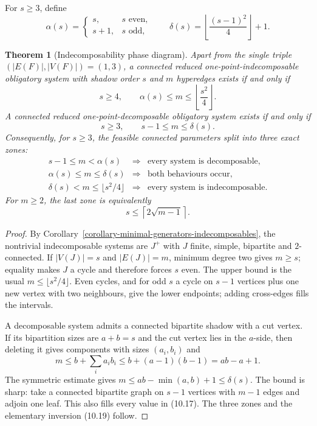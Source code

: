 \documentclass[a4paper,11pt,reqno]{amsart}
\theoremstyle{plain}
\newtheorem{theorem}{Theorem}[section]
\theoremstyle{definition}
\theoremstyle{remark}
\begin{document}
For $s\ge3$, define
\[
\alpha(s)=
\begin{cases}
s,&s\text{ even},\\
s+1,&s\text{ odd},
\end{cases}
\qquad
\delta(s)=\left\lfloor\frac{(s-1)^2}{4}\right\rfloor+1.
\]

\begin{theorem}[Indecomposability phase diagram]
\label{theorem-indecomposability-phase-diagram}
Apart from the single triple $(|E(F)|,|V(F)|)=(1,3)$, a connected reduced
one-point-indecomposable obligatory system with shadow order $s$ and $m$
hyperedges exists if and only if
\[
s\ge4,
\qquad
\alpha(s)\le m\le\left\lfloor\frac{s^2}{4}\right\rfloor.
\tag{10.16}
\]
A connected reduced one-point-decomposable obligatory system exists if and
only if
\[
s\ge3,
\qquad
s-1\le m\le\delta(s).
\tag{10.17}
\]
Consequently, for $s\ge3$, the feasible connected parameters split into three exact zones:
\[
\begin{array}{rcl}
s-1\le m<\alpha(s)
 &\Longrightarrow& \text{every system is decomposable},\\
\alpha(s)\le m\le\delta(s)
 &\Longrightarrow& \text{both behaviours occur},\\
\delta(s)<m\le\lfloor s^2/4\rfloor
 &\Longrightarrow& \text{every system is indecomposable}.
\end{array}
\tag{10.18}
\]
For $m\ge2$, the last zone is equivalently
\[
s\le\left\lceil2\sqrt{m-1}\right\rceil.
\tag{10.19}
\]
\end{theorem}
\begin{proof}
By Corollary~\ref{corollary-minimal-generators-indecomposables}, the nontrivial
indecomposable systems are $J^+$ with $J$ finite, simple, bipartite and
$2$-connected.  If $|V(J)|=s$ and $|E(J)|=m$, minimum degree two gives
$m\ge s$; equality makes $J$ a cycle and therefore forces $s$ even.  The
upper bound is the usual $m\le\lfloor s^2/4\rfloor$.  Even cycles, and for odd
$s$ a cycle on $s-1$ vertices plus one new vertex with two neighbours, give
the lower endpoints; adding cross-edges fills the intervals.

A decomposable system admits a connected bipartite shadow with a cut vertex.
If its bipartition sizes are $a+b=s$ and the cut vertex lies in the $a$-side,
then deleting it gives components with sizes $(a_i,b_i)$ and
\[
m\le b+\sum_i a_i b_i
 \le b+(a-1)(b-1)=ab-a+1.
\]
The symmetric estimate gives $m\le ab-\min(a,b)+1\le\delta(s)$.  The bound is
sharp: take a connected bipartite graph on $s-1$ vertices with $m-1$ edges and
adjoin one leaf.  This also fills every value in (10.17).  The three zones and
the elementary inversion (10.19) follow.
\end{proof}
\end{document}
